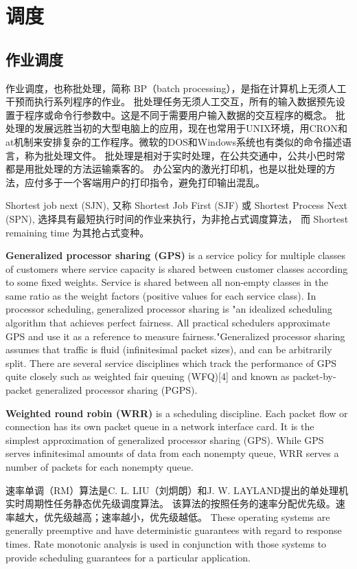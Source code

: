 \section{调度}

\subsection{作业调度}
作业调度，也称批处理，简称 BP（batch processing），是指在计算机上无须人工干预而执行系列程序的作业。
批处理任务无须人工交互，所有的输入数据预先设置于程序或命令行参数中。这是不同于需要用户输入数据的交互程序的概念。
批处理的发展远胜当初的大型电脑上的应用，现在也常用于UNIX环境，用CRON和at机制来安排复杂的工作程序。微软的DOS和Windows系统也有类似的命令描述语言，称为批处理文件。
批处理是相对于实时处理，在公共交通中，公共小巴时常都是用批处理的方法运输乘客的。
办公室内的激光打印机，也是以批处理的方法，应付多于一个客端用户的打印指令，避免打印输出混乱。

Shortest job next (SJN), 又称 Shortest Job First (SJF) 或 Shortest Process Next (SPN), 选择具有最短执行时间的作业来执行，为非抢占式调度算法，
而 Shortest remaining time 为其抢占式变种。

\textbf{Generalized processor sharing (GPS)} is a service policy for multiple classes of customers where service capacity is shared between customer classes according to some fixed weights. Service is shared between all non-empty classes in the same ratio as the weight factors (positive values for each service class). In processor scheduling, generalized processor sharing is "an idealized scheduling algorithm that achieves perfect fairness. All practical schedulers approximate GPS and use it as a reference to measure fairness."Generalized processor sharing assumes that traffic is fluid (infinitesimal packet sizes), and can be arbitrarily split. There are several service disciplines which track the performance of GPS quite closely such as weighted fair queuing (WFQ)[4] and known as packet-by-packet generalized processor sharing (PGPS).

\textbf{Weighted round robin (WRR)} is a scheduling discipline. Each packet flow or connection has its own packet queue in a network interface card. It is the simplest approximation of generalized processor sharing (GPS). While GPS serves infinitesimal amounts of data from each nonempty queue, WRR serves a number of packets for each nonempty queue.

速率单调（RM）算法是C. L. LIU（刘炯朗）和J. W. LAYLAND提出的单处理机实时周期性任务静态优先级调度算法。
该算法的按照任务的速率分配优先级。速率越大，优先级越高；速率越小，优先级越低。
These operating systems are generally preemptive and have deterministic guarantees with regard to response times. Rate monotonic analysis is used in conjunction with those systems to provide scheduling guarantees for a particular application.

